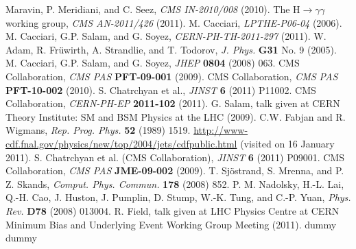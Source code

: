 \documentclass[12pt, letterpaper]{report}
\begin{document}
\begin{thebibliography}{99}
Maravin, P. Meridiani, and C. Seez, \textit{CMS IN-2010/008} (2010).
 The H$\rightarrow\gamma\gamma$ working group, \textit{CMS AN-2011/426} (2011).
 M. Cacciari, \textit{LPTHE-P06-04} (2006).
 M. Cacciari, G.P. Salam, and G. Soyez, \textit{CERN-PH-TH-2011-297} (2011).
 W. Adam, R. Fr\"uwirth, A. Strandlie, and T. Todorov, \textit{J. Phys.} \textbf{G31} No. 9 (2005).
 M. Cacciari, G.P. Salam, and G. Soyez, \textit{JHEP} \textbf{0804} (2008) 063.
 CMS Collaboration, \textit{CMS PAS} \textbf{PFT-09-001} (2009).
 CMS Collaboration, \textit{CMS PAS} \textbf{PFT-10-002} (2010).
 S. Chatrchyan et al., \textit{JINST} \textbf{6} (2011) P11002.
 CMS Collaboration, \textit{CERN-PH-EP} \textbf{2011-102} (2011).
 G. Salam, talk given at CERN Theory Institute: SM and BSM Physics at the LHC (2009).
 C.W. Fabjan and R. Wigmans, \textit{Rep. Prog. Phys.} \textbf{52} (1989) 1519.
 \url{http://www-cdf.fnal.gov/physics/new/top/2004/jets/cdfpublic.html} (visited on 16 January 2011).
 S. Chatrchyan et al. (CMS Collaboration), \textit{JINST} \textbf{6} (2011) P09001.
 CMS Collaboration, \textit{CMS PAS} \textbf{JME-09-002} (2009).
 T. Sj\"ostrand, S. Mrenna, and P. Z. Skands, \textit{Comput. Phys. Commun.} \textbf{178} (2008) 852.
 P. M. Nadolsky, H.-L. Lai, Q.-H. Cao, J. Huston, J. Pumplin, D. Stump, W.-K. Tung, and C.-P. Yuan, \textit{Phys. Rev.} \textbf{D78} (2008) 013004.
 R. Field, talk given at LHC Physics Centre at CERN Minimum Bias and Underlying Event Working Group Meeting (2011).
 dummy
 dummy
\end{thebibliography}
\end{document}
